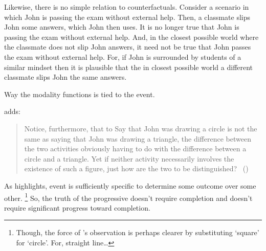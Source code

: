 \begin{note}
  Likewise, there is no simple relation to counterfactuals.
  Consider a scenario in which John is passing the exam without external help.
  Then, a classmate slips John some answers, which John then uses.
  It is no longer true that John is passing the exam without external help.
  And, in the closest possible world where the classmate does not slip John answers, it need not be true that John passes the exam without external help.
  For, if John is surrounded by students of a similar mindset then it is plausible that the in closest possible world a different classmate slips John the same answers.
\end{note}

\begin{note}
  Way the modality functions is tied to the event.

  \citeauthor{Dowty:1979vq} adds:
  \begin{quote}
    Notice, furthermore, that to Say that John was drawing a circle is not the same as saying that John was drawing a triangle, the difference between the two activities obviously having to do with the difference between a circle and a triangle.
    Yet if neither activity necessarily involves the existence of such a figure, just how are the two to be distinguished?%
    \mbox{ }\hfill\mbox{(\citeyear[133]{Dowty:1979vq})}
  \end{quote}

  As \citeauthor{Dowty:1979vq} highlights, event is sufficiently specific to determine some outcome over some other.%
  \footnote{
    Though, the force of \citeauthor{Dowty:1979vq}'s observation is perhaps clearer by substituting `square' for `circle'.
    For, straight line\dots
  }
  So, the truth of the progressive doesn't require completion and doesn't require significant progress toward completion.
\end{note}

